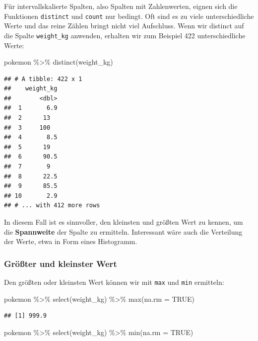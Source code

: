 \documentclass[
]{book}
\newenvironment{Shaded}{\begin{snugshade}}{\end{snugshade}}
\newcommand{\AttributeTok}[1]{\textcolor[rgb]{0.77,0.63,0.00}{#1}}
\newcommand{\ConstantTok}[1]{\textcolor[rgb]{0.00,0.00,0.00}{#1}}
\newcommand{\FunctionTok}[1]{\textcolor[rgb]{0.00,0.00,0.00}{#1}}
\newcommand{\NormalTok}[1]{#1}
\newcommand{\SpecialCharTok}[1]{\textcolor[rgb]{0.00,0.00,0.00}{#1}}
\begin{document}
Für intervallskalierte Spalten, also Spalten mit Zahlenwerten, eignen sich die Funktionen \texttt{distinct} und \texttt{count} nur bedingt. Oft sind es zu viele unterschiedliche Werte und das reine Zählen bringt nicht viel Aufschluss. Wenn wir distinct auf die Spalte \texttt{weight\_kg} anwenden, erhalten wir zum Beispiel 422 unterschiedliche Werte:

\begin{Shaded}
\begin{Highlighting}[]
\NormalTok{pokemon }\SpecialCharTok{\%\textgreater{}\%}
  \FunctionTok{distinct}\NormalTok{(weight\_kg)}
\end{Highlighting}
\end{Shaded}

\begin{verbatim}
## # A tibble: 422 x 1
##    weight_kg
##        <dbl>
##  1       6.9
##  2      13  
##  3     100  
##  4       8.5
##  5      19  
##  6      90.5
##  7       9  
##  8      22.5
##  9      85.5
## 10       2.9
## # ... with 412 more rows
\end{verbatim}

In diesem Fall ist es sinnvoller, den kleinsten und größten Wert zu kennen, um die \textbf{Spannweite} der Spalte zu ermitteln. Interessant wäre auch die Verteilung der Werte, etwa in Form eines Histogramm.

\hypertarget{gruxf6uxdfter-und-kleinster-wert}{%
\subsubsection{Größter und kleinster Wert}\label{gruxf6uxdfter-und-kleinster-wert}}

Den größten oder kleinsten Wert können wir mit \texttt{max} und \texttt{min} ermitteln:

\begin{Shaded}
\begin{Highlighting}[]
\NormalTok{pokemon }\SpecialCharTok{\%\textgreater{}\%}
  \FunctionTok{select}\NormalTok{(weight\_kg) }\SpecialCharTok{\%\textgreater{}\%}
  \FunctionTok{max}\NormalTok{(}\AttributeTok{na.rm =} \ConstantTok{TRUE}\NormalTok{)}
\end{Highlighting}
\end{Shaded}

\begin{verbatim}
## [1] 999.9
\end{verbatim}

\begin{Shaded}
\begin{Highlighting}[]
\NormalTok{pokemon }\SpecialCharTok{\%\textgreater{}\%}
  \FunctionTok{select}\NormalTok{(weight\_kg) }\SpecialCharTok{\%\textgreater{}\%}
  \FunctionTok{min}\NormalTok{(}\AttributeTok{na.rm =} \ConstantTok{TRUE}\NormalTok{)}
\end{Highlighting}
\end{Shaded}
\end{document}
